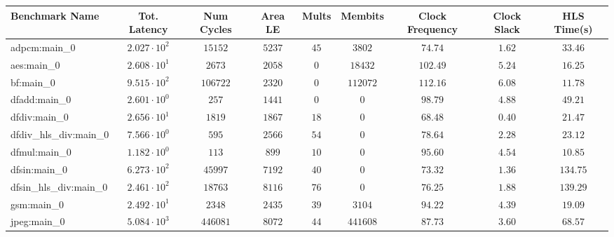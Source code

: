 \begin{tabular}{|l|c|c|c|c|c|c|c|c|}
\hline
Benchmark Name          & Tot. Latency           & Num Cycles & Area LE   & Mults   & Membits    & Clock Frequency & Clock Slack & HLS Time(s) \\
\hline
adpcm:main\_0           & $ 2.027 \cdot 10^{2} $ & $ 15152  $ & $ 5237  $ & $ 45  $ & $ 3802   $ & $ 74.74       $ & $ 1.62    $ & $ 33.46   $ \\
aes:main\_0             & $ 2.608 \cdot 10^{1} $ & $ 2673   $ & $ 2058  $ & $ 0   $ & $ 18432  $ & $ 102.49      $ & $ 5.24    $ & $ 16.25   $ \\
bf:main\_0              & $ 9.515 \cdot 10^{2} $ & $ 106722 $ & $ 2320  $ & $ 0   $ & $ 112072 $ & $ 112.16      $ & $ 6.08    $ & $ 11.78   $ \\
dfadd:main\_0           & $ 2.601 \cdot 10^{0} $ & $ 257    $ & $ 1441  $ & $ 0   $ & $ 0      $ & $ 98.79       $ & $ 4.88    $ & $ 49.21   $ \\
dfdiv:main\_0           & $ 2.656 \cdot 10^{1} $ & $ 1819   $ & $ 1867  $ & $ 18  $ & $ 0      $ & $ 68.48       $ & $ 0.40    $ & $ 21.47   $ \\
dfdiv\_hls\_div:main\_0 & $ 7.566 \cdot 10^{0} $ & $ 595    $ & $ 2566  $ & $ 54  $ & $ 0      $ & $ 78.64       $ & $ 2.28    $ & $ 23.12   $ \\
dfmul:main\_0           & $ 1.182 \cdot 10^{0} $ & $ 113    $ & $ 899   $ & $ 10  $ & $ 0      $ & $ 95.60       $ & $ 4.54    $ & $ 10.85   $ \\
dfsin:main\_0           & $ 6.273 \cdot 10^{2} $ & $ 45997  $ & $ 7192  $ & $ 40  $ & $ 0      $ & $ 73.32       $ & $ 1.36    $ & $ 134.75  $ \\
dfsin\_hls\_div:main\_0 & $ 2.461 \cdot 10^{2} $ & $ 18763  $ & $ 8116  $ & $ 76  $ & $ 0      $ & $ 76.25       $ & $ 1.88    $ & $ 139.29  $ \\
gsm:main\_0             & $ 2.492 \cdot 10^{1} $ & $ 2348   $ & $ 2435  $ & $ 39  $ & $ 3104   $ & $ 94.22       $ & $ 4.39    $ & $ 19.09   $ \\
jpeg:main\_0            & $ 5.084 \cdot 10^{3} $ & $ 446081 $ & $ 8072  $ & $ 44  $ & $ 441608 $ & $ 87.73       $ & $ 3.60    $ & $ 68.57   $ \\

\end{tabular}
